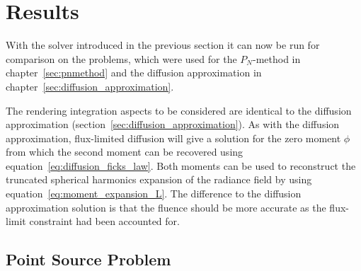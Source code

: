 \section{Results}
\label{sec:fld_results}

With the solver introduced in the previous section it can now be run for comparison on the problems, which were used for the $P_N$-method in chapter~\ref{sec:pnmethod} and the diffusion approximation in chapter~\ref{sec:diffusion_approximation}.

The rendering integration aspects to be considered are identical to the diffusion approximation (section~\ref{sec:diffusion_approximation}). As with the diffusion approximation, flux-limited diffusion will give a solution for the zero moment $\phi$ from which the second moment can be recovered using equation~\ref{eq:diffusion_ficks_law}. Both moments can be used to reconstruct the truncated spherical harmonics expansion of the radiance field by using equation~\ref{eq:moment_expansion_L}. The difference to the diffusion approximation solution is that the fluence should be more accurate as the flux-limit constraint had been accounted for.

\subsection{Point Source Problem}
\label{sec:pn_results_pointsource}

